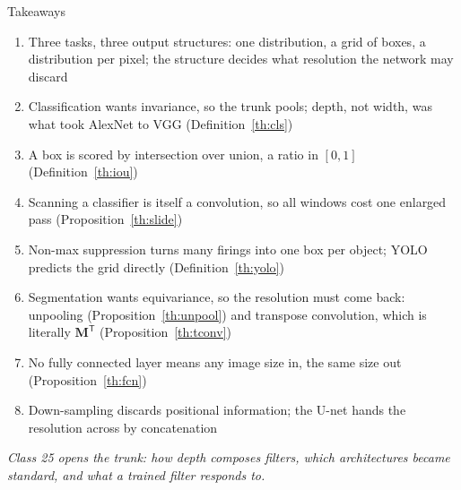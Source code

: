 \documentclass[aspectratio=169, 11pt]{beamer}
\newcommand{\bridge}[1]{%
  {\scriptsize\itshape\color{mcMuted} #1\par}\vspace{0.35em}}
\begin{document}
\begin{frame}{Takeaways}
  \vspace{-0.1em}
  {\scriptsize
  \begin{enumerate}\itemsep0.22em
    \item Three tasks, three output structures: one distribution, a
          grid of boxes, a distribution per pixel; the structure decides
          what resolution the network may discard
    \item Classification wants invariance, so the trunk pools; depth,
          not width, was what took AlexNet to VGG (Definition~\ref{th:cls})
    \item A box is scored by intersection over union, a ratio in
          $[0, 1]$ (Definition~\ref{th:iou})
    \item Scanning a classifier is itself a convolution, so all windows
          cost one enlarged pass (Proposition~\ref{th:slide})
    \item Non-max suppression turns many firings into one box per
          object; YOLO predicts the grid directly
          (Definition~\ref{th:yolo})
    \item Segmentation wants equivariance, so the resolution must come
          back: unpooling (Proposition~\ref{th:unpool}) and transpose
          convolution, which is literally $\mathbf{M}^{\mathsf T}$
          (Proposition~\ref{th:tconv})
    \item No fully connected layer means any image size in, the same
          size out (Proposition~\ref{th:fcn})
    \item Down-sampling discards positional information; the U-net
          hands the resolution across by concatenation
  \end{enumerate}}
  \bridge{Class 25 opens the trunk: how depth composes filters, which
  architectures became standard, and what a trained filter responds to.}
\end{frame}
\end{document}

